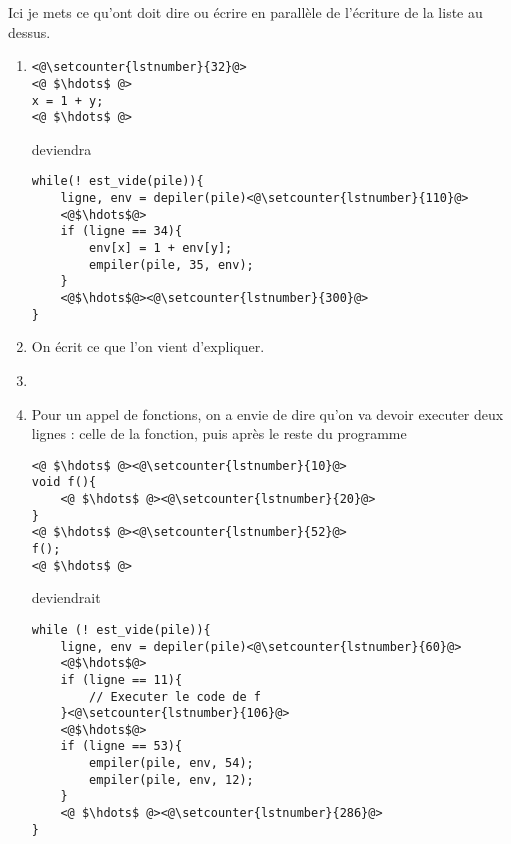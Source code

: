 \begin{com}
	Ici je mets ce qu'ont doit dire ou écrire en parallèle de l'écriture de la liste au dessus.
\end{com}
\begin{enumerate}
	\item \quad \begin{minipage}{0.25 \linewidth}
		\begin{lstlisting}[style=CStyle]
<@\setcounter{lstnumber}{32}@>
<@ $\hdots$ @>
x = 1 + y;
<@ $\hdots$ @>
\end{lstlisting} \end{minipage} \enspace deviendra \qquad \begin{minipage}{0.50 \linewidth}
		\begin{lstlisting}[style=CStyle]
while(! est_vide(pile)){
    ligne, env = depiler(pile)<@\setcounter{lstnumber}{110}@>
    <@$\hdots$@>
    if (ligne == 34){
        env[x] = 1 + env[y];
        empiler(pile, 35, env);
    }
    <@$\hdots$@><@\setcounter{lstnumber}{300}@>
}
\end{lstlisting}
	\end{minipage}
	
	\item On écrit ce que l'on vient d'expliquer.
	\item
	\item Pour un appel de fonctions, on a envie de dire qu'on va devoir executer deux lignes : celle de la fonction, puis après le reste du programme\\
	\begin{minipage}{0.2\linewidth}
\begin{lstlisting}[style=CStyle]
<@ $\hdots$ @><@\setcounter{lstnumber}{10}@>
void f(){
    <@ $\hdots$ @><@\setcounter{lstnumber}{20}@>
}
<@ $\hdots$ @><@\setcounter{lstnumber}{52}@>
f();
<@ $\hdots$ @>
\end{lstlisting}
	\end{minipage}\enspace deviendrait \qquad \begin{minipage}{0.50\linewidth}
\begin{lstlisting}[style=CStyle]
while (! est_vide(pile)){
    ligne, env = depiler(pile)<@\setcounter{lstnumber}{60}@>
    <@$\hdots$@>
    if (ligne == 11){
        // Executer le code de f
    }<@\setcounter{lstnumber}{106}@>
    <@$\hdots$@>
    if (ligne == 53){
        empiler(pile, env, 54);
        empiler(pile, env, 12);
    }
    <@ $\hdots$ @><@\setcounter{lstnumber}{286}@>
}
\end{lstlisting}
\end{minipage}
\end{enumerate}


